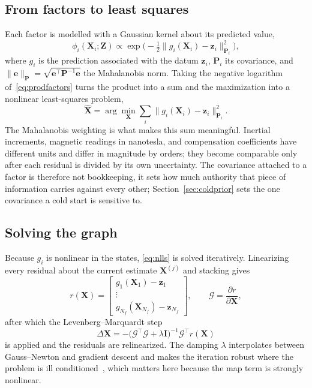 \subsection{From factors to least squares}
Each factor is modelled with a Gaussian kernel about its predicted value,
\begin{equation}
\phi_i(\mathbf{X}_i;\mathbf{Z})\propto
\exp\!\Big(-\tfrac{1}{2}\big\lVert g_i(\mathbf{X}_i)-\mathbf{z}_i\big\rVert^{2}_{\mathbf{P}_i}\Big),
\label{eq:kernel}
\end{equation}
where $g_i$ is the prediction associated with the datum $\mathbf{z}_i$,
$\mathbf{P}_i$ its covariance, and
$\lVert\mathbf{e}\rVert_{\mathbf{P}}=\sqrt{\mathbf{e}^{\top}\mathbf{P}^{-1}\mathbf{e}}$
the Mahalanobis norm. Taking the negative logarithm of~\eqref{eq:prodfactors}
turns the product into a sum and the maximization into a nonlinear least-squares
problem,
\begin{equation}
\hat{\mathbf{X}}=\arg\min_{\mathbf{X}}\sum_i
\big\lVert g_i(\mathbf{X}_i)-\mathbf{z}_i\big\rVert^{2}_{\mathbf{P}_i}.
\label{eq:nlls}
\end{equation}
The Mahalanobis weighting is what makes this sum meaningful. Inertial
increments, magnetic readings in nanotesla, and compensation coefficients have
different units and differ in magnitude by orders; they become comparable only
after each residual is divided by its own uncertainty. The covariance attached
to a factor is therefore not bookkeeping, it sets how much authority that piece
of information carries against every other; Section~\ref{sec:coldprior} sets the
one covariance a cold start is sensitive to.

\subsection{Solving the graph}
Because $g_i$ is nonlinear in the states, \eqref{eq:nlls} is solved
iteratively. Linearizing every residual about the current estimate
$\mathbf{X}^{(j)}$ and stacking gives
\begin{equation}
r(\mathbf{X})=
\begin{bmatrix} g_1(\mathbf{X}_1)-\mathbf{z}_1\\ \vdots\\
g_{N_f}(\mathbf{X}_{N_f})-\mathbf{z}_{N_f}\end{bmatrix},
\qquad
\mathcal{G}=\frac{\partial r}{\partial\mathbf{X}},
\label{eq:resstack}
\end{equation}
after which the Levenberg--Marquardt step
\begin{equation}
\Delta\mathbf{X}=-\big(\mathcal{G}^{\top}\mathcal{G}+\lambda\mathbf{I}\big)^{-1}
\mathcal{G}^{\top}r(\mathbf{X})
\label{eq:lm}
\end{equation}
is applied and the residuals are relinearized. The damping $\lambda$ interpolates
between Gauss--Newton and gradient descent and makes the iteration robust where
the problem is ill conditioned~\cite{dellaert2006}, which matters here because
the map term is strongly nonlinear.

